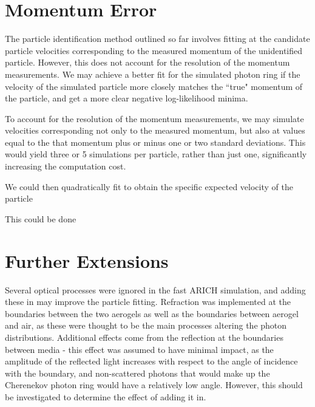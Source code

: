 

\section{Momentum Error}
The particle identification method outlined so far involves fitting at the candidate particle velocities corresponding to the measured momentum of the unidentified particle.
However, this does not account for the resolution of the momentum measurements.
We may achieve a better fit for the simulated photon ring if the velocity of the simulated particle more closely matches the ``true" momentum of the particle, and get a more clear negative log-likelihood minima. 

To account for the resolution of the momentum measurements, we may simulate velocities corresponding not only to the measured momentum, but also at values equal to the that momentum plus or minus one or two standard deviations.
This would yield three or 5 simulations per particle, rather than just one, significantly increasing the computation cost. 

We could then quadratically fit to obtain the specific expected velocity of the particle

This could be done


\section{Further Extensions}
Several optical processes were ignored in the fast ARICH simulation, and adding these in may improve the particle fitting. 
Refraction was implemented at the boundaries between the two aerogels as well as the boundaries between aerogel and air, as these were thought to be the main processes altering the photon distributions.
Additional effects come from the reflection at the boundaries between media - this effect was assumed to have minimal impact, as the amplitude of the reflected light increases with respect to the angle of incidence with the boundary, and non-scattered photons that would make up the Cherenekov photon ring would have a relatively low angle.
However, this should be investigated to determine the effect of adding it in.

